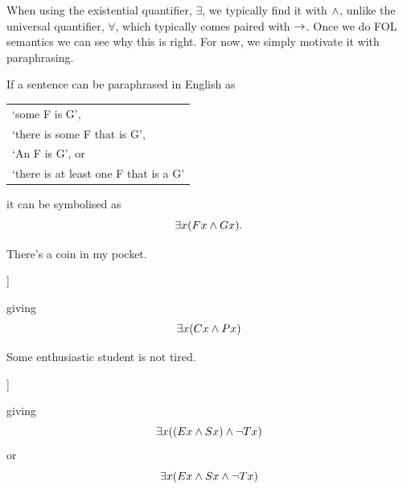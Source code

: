 When using the existential quantifier, $\exists$, we typically find it with $\mathbin{\wedge}$, unlike the universal quantifier, $\forall$, which typically comes paired with $\rightarrow$. Once we do FOL semantics we can see why this is right.  For now, we simply motivate it with paraphrasing. 


	\begin{highlighted}
	If a sentence can be paraphrased in English as \begin{center}
		\begin{tabular}{l}`some F is G',\\`there is some F that is G', \\`An F is G', or \\`there is at least one F that is a G'
		\end{tabular}
	\end{center} it can be symbolised as $$\exists x (Fx \mathbin{\wedge} Gx).$$
\end{highlighted}

\begin{samplesent}
	\item There's a coin in my pocket.
\end{samplesent}
\begin{center}
	\begin{forest}
		[There's a coin in my pocket. \\
		There exists $x$: \ldots and \ldots\\
		$\exists x(\ldots\eand \ldots)$
		[$x$ is a coin\\$Cx$]
		[$x$ is in my pocket\\$Px$]
		]
	\end{forest}
\end{center}
giving $$\exists x(Cx\mathbin{\wedge} Px)$$
\begin{samplesent}
	\item Some enthusiastic student is not tired.
\end{samplesent}

\begin{center}
	\begin{forest}
		[Some enthusiastic student is not tired\\
		There exists $x$:  \ldots and \ldots\\
		$\exists x(\ldots\eand \ldots)$
		[$x$ is an enthusiastic student\\$Ex\eand Sx$]
		[$x$ is not tired\\$\enot Tx$]
		]
	\end{forest}
\end{center}
giving 
$$\exists x((Ex\mathbin{\wedge} Sx)\mathbin{\wedge}\neg Tx)$$
or $$\exists x(Ex\mathbin{\wedge} Sx\mathbin{\wedge}\neg Tx)$$


